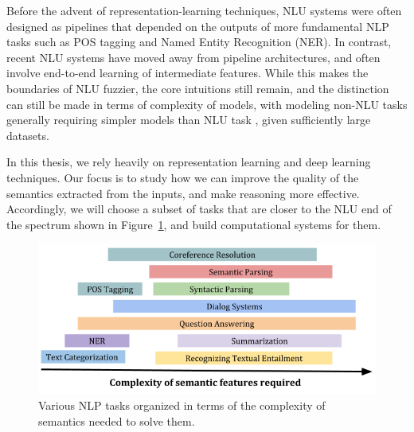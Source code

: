 Before the advent of representation-learning techniques, NLU systems were often designed as pipelines that depended on the
outputs of more fundamental NLP tasks such as POS tagging and Named Entity Recognition (NER). In contrast, recent NLU systems have moved away from pipeline
architectures, and often involve end-to-end learning of intermediate features.
While this makes the boundaries of NLU fuzzier, the core intuitions still remain, and the distinction can still be made in terms of complexity of models, with modeling non-NLU tasks
generally requiring simpler models \citep{wang2015part} than NLU task \citep{chen2017enhanced}, given sufficiently large datasets.

In this thesis, we rely heavily on representation learning and deep learning techniques. Our focus is to study how we can improve the quality of the semantics extracted from the inputs, and make reasoning more effective.
Accordingly, we will choose a subset of tasks that are closer to the NLU end of the spectrum shown in Figure~\ref{fig:nlu_spectrum}, and build
computational systems for them.

\begin{figure}
\begin{center}
\includegraphics[width=5in]{figures/NLU_spectrum.png}
\caption{Various NLP tasks organized in terms of the complexity of semantics needed to solve them.}\label{fig:nlu_spectrum}
\end{center}
\end{figure}

